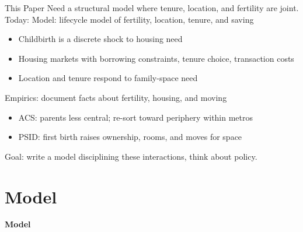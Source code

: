 \documentclass[11pt,aspectratio=169]{beamer}
\begin{document}
\begin{frame}{This Paper}
Need a structural model where tenure, location, and fertility are joint.
Today:
\vfill
\alert{Model:} lifecycle model of fertility, location, tenure, and saving
\begin{itemize}
  \vfill \item Childbirth is a discrete shock to housing need
  \vfill \item Housing markets with borrowing constraints, tenure choice, transaction costs
  \vfill \item Location and tenure respond to family-space need
\end{itemize}

\vfill
\alert{Empirics:} document facts about fertility, housing, and moving
\begin{itemize}
  \vfill \item ACS: parents less central; re-sort toward periphery within metros
  \vfill \item PSID: first birth raises ownership, rooms, and moves for space
\end{itemize}

\vfill
\alert{Goal:} write a model disciplining these interactions, think about policy.
\end{frame}

\section{Model}

\begin{frame}
\centering
{\Large\textbf{Model}}
\end{frame}
\end{document}
